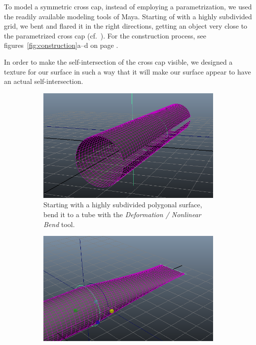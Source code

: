 \documentclass[11pt,            %
               a4paper,         %
               oneside,         %
               DIV12,           %
               fleqn,           %
               halfparskip,     %
               nochapterprefix, %
              ]{scrartcl} %
\theoremstyle{definition}
\begin{document}
To model a symmetric cross cap, instead of employing a parametrization, we used
the readily available modeling tools of Maya.
Starting of with a highly subdivided grid, we bent and flared it in
the right directions, getting an object very close to the parametrized
cross cap (cf.~\cite{rp2}). For the construction process, see
figures~\ref{fig:construction}a--d on page \pageref{fig:construction}.

In order to make the self-intersection of the cross cap visible, we
designed a texture for our surface in such a way that it will make our
surface appear to have an actual self-intersection.

\begin{landscape}
\begin{figure}[p]
  \vspace{-1em}
  \caption{\label{fig:construction}%
    The construction process of the cross cap model}
  \vspace{.5em}
  \begin{subfigure}[t]{10cm}
    \centering
    \includegraphics[width=\textwidth]{screenshots/construction01.png}
    \caption{Starting with a highly subdivided polygonal surface,
      bend it to a tube with the \emph{Deformation / Nonlinear Bend}
      tool.}
  \end{subfigure}
  \hspace{2em}
  \begin{subfigure}[t]{10cm}
    \centering
    \includegraphics[width=\textwidth]{screenshots/construction02.png}

\end{subfigure}
\end{figure}
\end{landscape}
\end{document}
